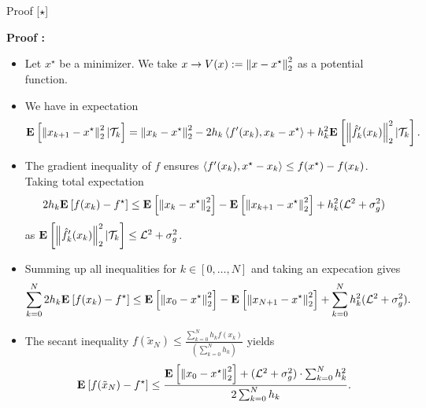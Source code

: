 \documentclass[9pt]{beamer}
\begin{document}
\begin{frame}{Proof [$\star$]}


  \textbf{Proof :}
  \begin{itemize}
  \item Let $x^\star$ be a minimizer. We take $x\to V(x):= \left\|x-x^\star\right\|^2_2$ as a potential function.
  \item<2-> We have in expectation
    \[
      \mathbf{E}_{} \left[ \left\|x_{k+1}-x^\star\right\|^2_2|\mathcal T_k \right] = \left\|x_k-x^\star\right\|^2_2 - 2 h_k \left<f'(x_k) ,  x_k -x^\star\right> + h_k^2 \mathbf{E}_{} \left[ \left\|\hat f_k'(x_k)\right\|_2^2|\mathcal T_k \right].
    \]
  \item<3-> The gradient inequality of $f$ ensures $\left<f'(x_k), x^\star-x_k\right>\leq f(x^\star)-f(x_k)$. Taking total expectation
    \[
      2 h_k \mathbf{E}_{} \left[ f(x_k)-f^\star \right] \leq \mathbf{E}_{} \left[ \left\|x_k-x^\star\right\|^2_2 \right] - \mathbf{E}_{} \left[ \left\|x_{k+1}-x^\star\right\|_2^2 \right] + h_k^2 (\mathcal L^2+\sigma^2_g)
    \]
    as $\mathbf{E}_{} \left[ \left\|\hat f_k'(x_k)\right\|_2^2|\mathcal T_k \right]\leq \mathcal L^2+\sigma^2_g$.
  \item<4-> Summing up all inequalities for $k\in [0, \dots, N]$ and taking an expecation gives
    \[
      \sum_{k=0}^N 2 h_k \mathbf{E}_{} \left[ f(x_k)-f^\star \right] \leq \mathbf{E}_{} \left[ \left\|x_0-x^\star\right\|_2^2 \right] - \mathbf{E}_{} \left[ \left\|x_{N+1}-x^\star\right\|_2^2 \right] + \sum_{k=0}^N h_k^2 (\mathcal L^2+\sigma^2_g).
    \]
  \item<5-> The secant inequality $f(\tilde x_N) \leq \tfrac{\sum_{k=0}^N h_k f(x_k)}{(\sum_{k=0}^N h_k)} $ yields
    \[
      \mathbf{E}_{} \left[ f(\tilde x_N) - f^\star \right]\leq \frac{\mathbf{E}_{} \left[ \left\|x_0-x^\star\right\|_2^2 \right]+(\mathcal L^2+\sigma^2_g) \cdot \sum_{k=0}^N h_k^2 }{2 \sum_{k=0}^N h_k}.
    \]    
  \end{itemize}


\end{frame}
\end{document}
